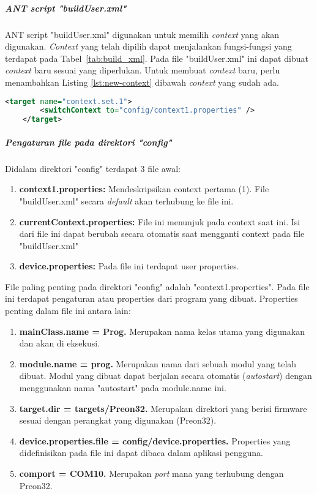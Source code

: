 \subparagraph{ANT script "buildUser.xml"}
ANT script "buildUser.xml" digunakan untuk memilih \textit{context} yang akan digunakan. \textit{Context} yang telah dipilih dapat menjalankan fungsi-fungsi yang terdapat pada Tabel~\ref{tab:build_xml}. Pada file "buildUser.xml" ini dapat dibuat \textit{context} baru sesuai yang diperlukan. Untuk membuat \textit{context} baru, perlu menambahkan Listing \ref{lst:new-context} dibawah \textit{context} yang sudah ada.
\begin{lstlisting}[caption={Contoh membuat context baru},label={lst:new-context},language=xml]
    <target name="context.set.1">
        <switchContext to="config/context1.properties" />
    </target>
\end{lstlisting}

\subparagraph{Pengaturan file pada direktori "config"} 
Didalam direktori "config" terdapat 3 file awal:
\begin{enumerate}
	\item \textbf{context1.properties:} Mendeskripsikan context pertama (1). File "buildUser.xml" secara \textit{default} akan terhubung ke file ini.
	\item \textbf{currentContext.properties:} File ini menunjuk pada context saat ini. Isi dari file ini dapat berubah secara otomatis saat mengganti context pada file "buildUser.xml"
	\item \textbf{device.properties:} Pada file ini terdapat user properties.
\end{enumerate}

File paling penting pada direktori "config" adalah "context1.properties". Pada file ini terdapat pengaturan atau properties dari program yang dibuat. Properties penting dalam file ini antara lain:
\begin{enumerate}
	\item \textbf{mainClass.name = Prog.} Merupakan nama kelas utama yang digunakan dan akan di eksekusi.
	\item \textbf{module.name = prog.} Merupakan nama dari sebuah modul yang telah dibuat. Modul yang dibuat dapat berjalan secara otomatis (\textit{autostart}) dengan menggunakan nama "autostart" pada module.name ini.
	\item \textbf{target.dir = targets/Preon32.} Merupakan direktori yang berisi firmware sesuai dengan perangkat yang digunakan (Preon32).
	\item \textbf{device.properties.file = config/device.properties.} Properties yang didefinisikan pada file ini dapat dibaca dalam aplikasi pengguna. 
	\item \textbf{comport = COM10.} Merupakan \textit{port} mana yang terhubung dengan Preon32. 
\end{enumerate}

